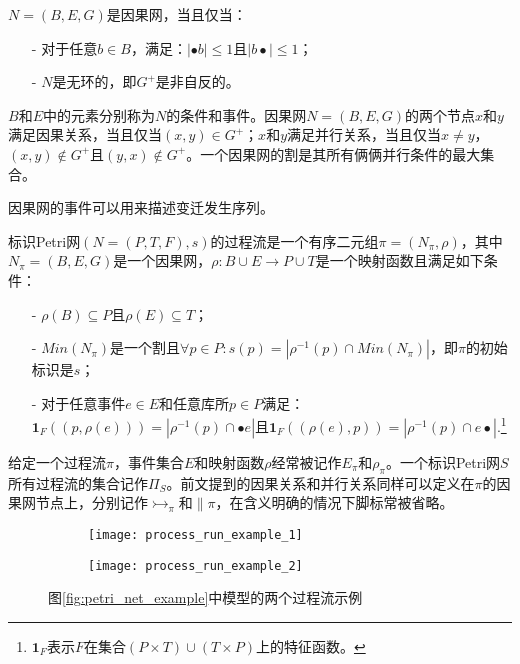 \begin{definition}\label{def:causal_net}
$N=(B,E,G)$是因果网，当且仅当：
  \begin{itemize}
  	\item[-] 对于任意$b\in B$，满足：$|\bullet b|\leq 1$且$|b\bullet|\leq 1$；
  	\item[-] $N$是无环的，即$G^{+}$是非自反的。
  \end{itemize}
\end{definition}

$B$和$E$中的元素分别称为$N$的条件和事件。因果网$N=(B,E,G)$的两个节点$x$和$y$满足因果关系，当且仅当$(x,y)\in G^{+}$；$x$和$y$满足并行关系，当且仅当$x\neq y$，$(x,y)\notin G^{+}$且$(y,x)\notin G^{+}$。一个因果网的割是其所有俩俩并行条件的最大集合。

因果网的事件可以用来描述变迁发生序列。

\begin{definition}\label{def:process_run}
标识Petri网$(N=(P,T,F),s)$的过程流是一个有序二元组$\pi=(N_{\pi},\rho)$，其中$N_{\pi}=(B,E,G)$是一个因果网，$\rho:B\cup E\rightarrow P\cup T$是一个映射函数且满足如下条件：
  \begin{itemize}
  	\item[-] $\rho(B)\subseteq P$且$\rho(E)\subseteq T$；
  	\item[-] $Min(N_{\pi})$是一个割且$\forall p\in P:s(p)=|\rho^{-1}(p)\cap Min(N_{\pi})|$，即$\pi$的初始标识是$s$；
  	\item[-] 对于任意事件$e\in E$和任意库所$p\in P$满足：$\bm{1}_{F}((p,\rho(e)))=|\rho^{-1}(p)\cap\bullet e|$且$\bm{1}_{F}((\rho(e),p))=|\rho^{-1}(p)\cap e\bullet|$.\footnote{$\bm{1}_{F}$表示$F$在集合$(P\times T)\cup(T\times P)$上的特征函数。}
  \end{itemize}
\end{definition}

给定一个过程流$\pi$，事件集合$E$和映射函数$\rho$经常被记作$E_{\pi}$和$\rho_{\pi}$。一个标识Petri网$S$所有过程流的集合记作$\Pi_{S}$。前文提到的因果关系和并行关系同样可以定义在$\pi$的因果网节点上，分别记作$\rightarrowtail_{\pi}$和$\parallel{\pi}$，在含义明确的情况下脚标常被省略。

\begin{figure}[htbp]
  \centering
  \begin{subfigure}{1\textwidth}
  	\centering
  	\texttt{[image: process\_run\_example\_1]}
  	\caption{\label{fig:process_run_example_1}}
  \end{subfigure}
  \begin{subfigure}{1\textwidth}
  	\centering
  	\texttt{[image: process\_run\_example\_2]}
  	\caption{\label{fig:process_run_example_2}}
  \end{subfigure}
  \caption{图\ref{fig:petri_net_example}中模型的两个过程流示例}
\end{figure}

